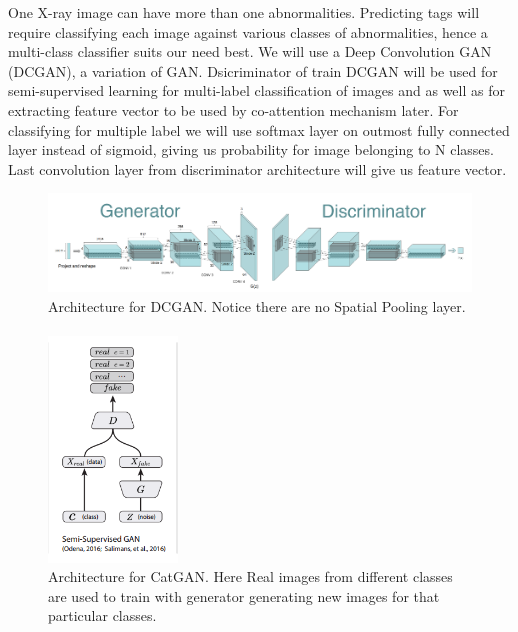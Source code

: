 \documentclass[12pt]{article}
\numberwithin{figure}{section}
\begin{document}
One X-ray image can have more than one abnormalities. Predicting tags will require classifying each image against various classes of abnormalities, hence a multi-class classifier suits our need best. We will use a Deep Convolution GAN (DCGAN)\cite{3}, a variation of GAN. Dsicriminator of train DCGAN will  be used for semi-supervised learning for multi-label classification of images and as well as for extracting feature vector to be used by co-attention mechanism later. For classifying for multiple label we will use softmax layer on outmost fully connected layer instead of sigmoid, giving us probability for image belonging to N classes. Last convolution layer from discriminator architecture will give us feature vector.
\begin{figure}[h]
    \centering
    \includegraphics[width=\textwidth]{dcgan.png}
    \caption{Architecture for DCGAN. Notice there are no Spatial Pooling layer.}
    \label{fig:my_label}
\end{figure}
\paragraph{}
\begin{figure}[h]
    \centering
    \includegraphics[width=130]{ACGAN.png}
    \caption{Architecture for CatGAN. Here Real images from different classes are used to train with generator generating new images for that particular classes.}
    \label{fig:my_label}
\end{figure}
\end{document}
